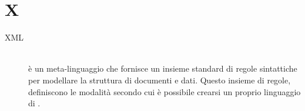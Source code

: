 \documentclass[12pt,a4paper]{article}
\begin{document}
\newpage

\section{X}

\begin{description}
\item[XML] 
\hfill\\è un meta-linguaggio che fornisce un insieme standard di regole sintattiche per modellare la struttura di documenti e dati. Questo insieme di regole, definiscono le modalità secondo cui è possibile crearsi un proprio linguaggio di  .
\end{description}
\end{document}
